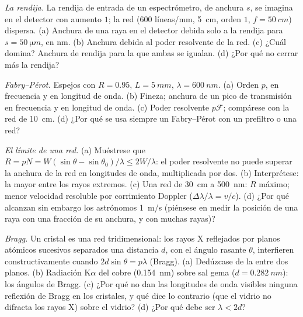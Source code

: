 \begin{exercise}[$\star\star$]\label{exo:b2:gratings:8}
\emph{La rendija.} La rendija de entrada de un espectrómetro, de anchura $s$, se imagina
en el detector con aumento $1$; la red ($600$ líneas/mm,
\qty{5}{cm}, orden $1$, $f = \qty{50}{cm}$) dispersa. (a) Anchura de una raya en
el detector debida solo a la rendija para $s = \qty{50}{\micro m}$, en nm. (b)
Anchura debida al poder resolvente de la red. (c) ¿Cuál domina? Anchura de rendija
para la que ambas se igualan. (d) ¿Por qué no cerrar más la rendija?
\end{exercise}

\begin{exercise}[$\star\star$]\label{exo:b2:gratings:9}
\emph{Fabry--Pérot.} Espejos con $R = 0.95$, $L = \qty{5}{mm}$, $\lambda = \qty{600}{nm}$.
(a) Orden $p$,  en frecuencia y en longitud de onda. (b)
Fineza; anchura de un pico de transmisión en frecuencia y en longitud de onda. (c)
Poder resolvente $p\mathcal F$; compárese con la red de \qty{10}{cm}. (d) ¿Por qué
se usa siempre un Fabry--Pérot con un prefiltro o una red?
\end{exercise}

\begin{exercise}[$\star\star\star$]\label{exo:b2:gratings:10}
\emph{El límite de una red.} (a) Muéstrese que $R = pN = W(\sin\theta - \sin\theta_0)
/\lambda \le 2W/\lambda$: el poder resolvente no puede superar la anchura de la
red en longitudes de onda, multiplicada por dos. (b) Interprétese: la mayor  entre los rayos extremos. (c) Una red de \qty{30}{cm} a
\qty{500}{nm}: $R$ máximo; menor velocidad resoluble por corrimiento Doppler
($\Delta\lambda/\lambda = v/c$). (d) ¿Por qué alcanzan sin embargo los astrónomos \qty{1}{m/s}
(piénsese en medir la posición de una raya con una fracción de su anchura,
y con muchas rayas)?
\end{exercise}

\begin{exercise}[$\star\star\star$]\label{exo:b2:gratings:11}
\emph{Bragg.} Un cristal es una red tridimensional: los rayos X
reflejados por planos atómicos sucesivos separados una distancia $d$, con el
ángulo rasante $\theta$, interfieren constructivamente cuando $2d\sin\theta = p\lambda$
(Bragg). (a) Dedúzcase de la  entre dos planos.
(b) Radiación K$\alpha$ del cobre (\qty{0.154}{nm}) sobre sal gema ($d = \qty{0.282}{nm}$):
los ángulos de Bragg. (c) ¿Por qué no dan las longitudes de onda visibles ninguna reflexión
de Bragg en los cristales, y qué dice lo contrario (que el vidrio no difracta
los rayos X) sobre el vidrio? (d) ¿Por qué debe ser $\lambda < 2d$?
\end{exercise}

